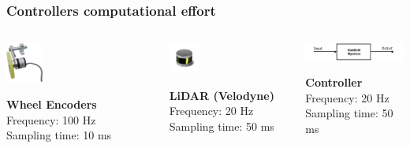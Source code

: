 \documentclass[9pt, aspectratio=169]{beamer}
\begin{document}
\begin{frame}
\frametitle{Controllers computational effort}
\begin{columns}
\begin{column}{0.22\textwidth}
\begin{block}{}
	\begin{center}
  		\includegraphics[width=0.25\textwidth]{Wheel_Encoder} 
	\end{center}
\centering
\textbf{Wheel Encoders} \\
Frequency: 100 Hz \\
Sampling time: 10 ms
\end{block}
\end{column}

\begin{column}{0.22\textwidth}
\begin{block}{}
	\begin{center}
  		\includegraphics[width=0.25\textwidth]{Lidar} 
	\end{center}
\centering
\textbf{LiDAR (Velodyne)} \\
Frequency: 20 Hz \\
Sampling time: 50 ms
\end{block}
\end{column}


\begin{column}{0.22\textwidth}
\begin{block}{}
	\begin{center}
  		\includegraphics[width=1\textwidth]{Control} 
	\end{center}
\centering
\textbf{Controller} \\
Frequency: 20 Hz \\
Sampling time: 50 ms
\end{block}
\end{column}


\end{columns}
\end{frame}
\end{document}
